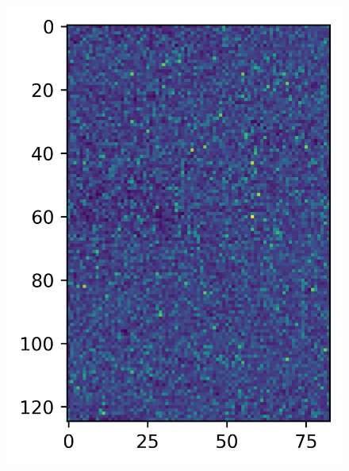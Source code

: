 \begin{figure}
\begin{multicols}{2}
    \includegraphics[width=\linewidth]{Graphics/mm-horizontal.png}\par 
    \end{multicols}
\begin{multicols}{2}

\end{multicols}
\end{figure}
